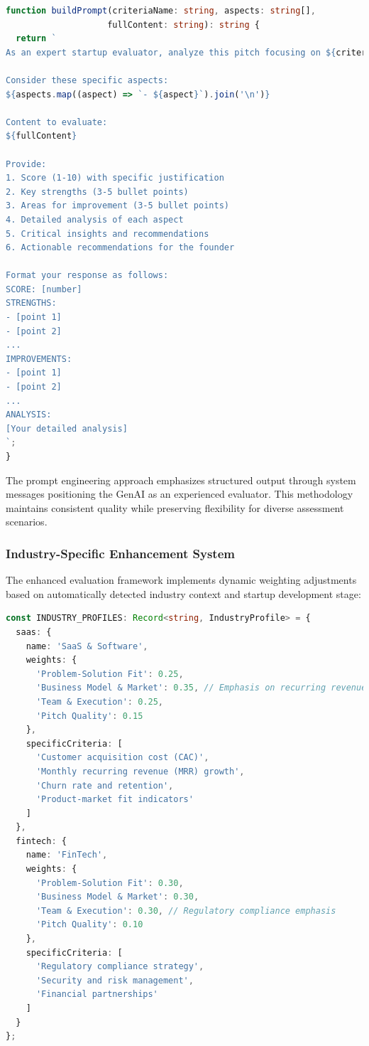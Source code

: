 \begin{lstlisting}[language=TypeScript, caption=GenAI Prompt Engineering System, label=lst:prompt-engineering]
function buildPrompt(criteriaName: string, aspects: string[], 
                    fullContent: string): string {
  return `
As an expert startup evaluator, analyze this pitch focusing on ${criteriaName}.

Consider these specific aspects:
${aspects.map((aspect) => `- ${aspect}`).join('\n')}

Content to evaluate:
${fullContent}

Provide:
1. Score (1-10) with specific justification
2. Key strengths (3-5 bullet points)
3. Areas for improvement (3-5 bullet points) 
4. Detailed analysis of each aspect
5. Critical insights and recommendations
6. Actionable recommendations for the founder

Format your response as follows:
SCORE: [number]
STRENGTHS:
- [point 1]
- [point 2]
...
IMPROVEMENTS:
- [point 1]
- [point 2]
...
ANALYSIS:
[Your detailed analysis]
`;
}
\end{lstlisting}

The prompt engineering approach emphasizes structured output through system messages positioning the GenAI as an experienced evaluator. This methodology maintains consistent quality while preserving flexibility for diverse assessment scenarios.

\subsubsection{Industry-Specific Enhancement System}
The enhanced evaluation framework implements dynamic weighting adjustments based on automatically detected industry context and startup development stage:

\begin{lstlisting}[language=TypeScript, caption=Industry-Specific Weight Configuration, label=lst:industry-weights]
const INDUSTRY_PROFILES: Record<string, IndustryProfile> = {
  saas: {
    name: 'SaaS & Software',
    weights: {
      'Problem-Solution Fit': 0.25,
      'Business Model & Market': 0.35, // Emphasis on recurring revenue
      'Team & Execution': 0.25,
      'Pitch Quality': 0.15
    },
    specificCriteria: [
      'Customer acquisition cost (CAC)',
      'Monthly recurring revenue (MRR) growth',
      'Churn rate and retention',
      'Product-market fit indicators'
    ]
  },
  fintech: {
    name: 'FinTech',
    weights: {
      'Problem-Solution Fit': 0.30,
      'Business Model & Market': 0.30,
      'Team & Execution': 0.30, // Regulatory compliance emphasis
      'Pitch Quality': 0.10
    },
    specificCriteria: [
      'Regulatory compliance strategy',
      'Security and risk management',
      'Financial partnerships'
    ]
  }
};
\end{lstlisting}

